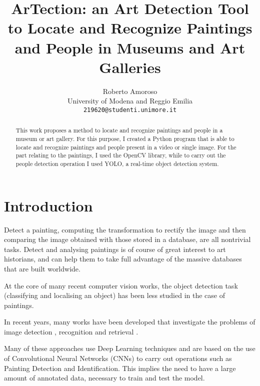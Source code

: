 \documentclass[10pt,twocolumn,letterpaper]{article}
\begin{document}
\title{ ArTection: an Art Detection Tool to Locate and Recognize Paintings and People in Museums and Art Galleries}

\author{Roberto Amoroso\\
University of Modena and Reggio Emilia\\
{\tt\small 219620@studenti.unimore.it}
}

\maketitle

\begin{abstract}
   This work proposes a method to locate and recognize paintings and people in a museum or art gallery. For this purpose, I created a Python program that is able to locate and recognize paintings and people present in a video or single image. For the part relating to the paintings, I used the OpenCV library, while to carry out the people detection operation I used YOLO, a real-time object detection system.
\end{abstract}

\section{Introduction}
Detect a painting, computing the transformation to rectify the image and then comparing the image obtained with those stored in a database, are all nontrivial tasks. Detect and analysing paintings is of course of great interest to art historians, and can help them to take full advantage of the massive databases that are built worldwide.

At the core of many recent computer vision works, the object detection task (classifying and localising an object) has
been less studied in the case of paintings.

In recent years, many works have been developed that investigate the problems of image detection \cite{fathy1995image,hambly2001supercosmos}, recognition \cite{martinel2013robust} and retrieval \cite{rui1999image}. 

Many of these approaches use Deep Learning techniques and are based on the use of Convolutional Neural Networks (CNNs) to carry out operations such as Painting Detection and Identification\cite{hong2019art}. This implies the need to have a large amount of annotated data, necessary to train and test the model.
\end{document}
